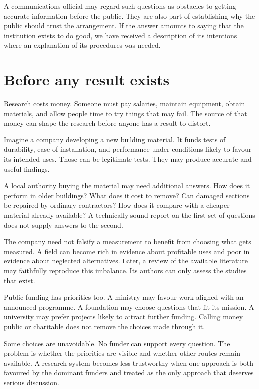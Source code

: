 \documentclass[12pt,a4paper]{book}
\begin{document}
A communications official may regard such questions as obstacles to getting accurate information before the public. They are also part of establishing why the public should trust the arrangement. If the answer amounts to saying that the institution exists to do good, we have received a description of its intentions where an explanation of its procedures was needed.

\section*{Before any result exists}

Research costs money. Someone must pay salaries, maintain equipment, obtain materials, and allow people time to try things that may fail. The source of that money can shape the research before anyone has a result to distort.

Imagine a company developing a new building material. It funds tests of durability, ease of installation, and performance under conditions likely to favour its intended uses. Those can be legitimate tests. They may produce accurate and useful findings.

A local authority buying the material may need additional answers. How does it perform in older buildings? What does it cost to remove? Can damaged sections be repaired by ordinary contractors? How does it compare with a cheaper material already available? A technically sound report on the first set of questions does not supply answers to the second.

The company need not falsify a measurement to benefit from choosing what gets measured. A field can become rich in evidence about profitable uses and poor in evidence about neglected alternatives. Later, a review of the available literature may faithfully reproduce this imbalance. Its authors can only assess the studies that exist.

Public funding has priorities too. A ministry may favour work aligned with an announced programme. A foundation may choose questions that fit its mission. A university may prefer projects likely to attract further funding. Calling money public or charitable does not remove the choices made through it.

Some choices are unavoidable. No funder can support every question. The problem is whether the priorities are visible and whether other routes remain available. A research system becomes less trustworthy when one approach is both favoured by the dominant funders and treated as the only approach that deserves serious discussion.
\end{document}

